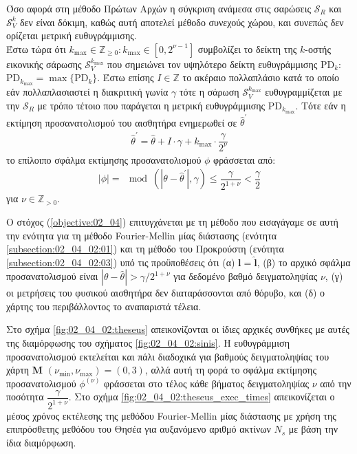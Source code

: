 Όσο αφορά στη μέθοδο Πρώτων Αρχών η σύγκριση ανάμεσα στις σαρώσεις
$\mathcal{S}_R$ και $\mathcal{S}_V^k$ δεν είναι δόκιμη, καθώς αυτή αποτελεί
μέθοδο συνεχούς χώρου, και συνεπώς δεν ορίζεται μετρική ευθυγράμμισης. \\

Έστω τώρα ότι $k_{\max} \in \mathbb{Z}_{\geq 0} : k_{\max} \in [0,2^{\nu-1}]$
συμβολίζει το δείκτη της $k$-οστής εικονικής σάρωσης $\mathcal{S}_V^{k_{\max}}$
που σημειώνει τον υψηλότερο δείκτη ευθυγράμμισης PD$_k$:
$\text{PD}_{k_{\max}} = \max \{\text{PD}_k\}$. Έστω επίσης $I \in \mathbb{Z}$
το ακέραιο πολλαπλάσιο κατά το οποίο εάν πολλαπλασιαστεί η διακριτική γωνία
$\gamma$ τότε η σάρωση $\mathcal{S}_V^{k_{\max}}$ ευθυγραμμίζεται με την
$\mathcal{S}_R$ με τρόπο τέτοιο που παράγεται η μετρική ευθυγράμμισης
PD$_{k_{\max}}$. Τότε εάν η εκτίμηση προσανατολισμού του αισθητήρα ενημερωθεί
σε $\hat{\theta}^\prime$
\begin{align}
  \hat{\theta}^\prime = \hat{\theta} + I \cdot \gamma + k_{\max} \cdot \dfrac{\gamma}{2^\nu}
\end{align}
το επίλοιπο σφάλμα εκτίμησης προσανατολισμού $\phi$ φράσσεται από:
\begin{align}
  |\phi| = \mod(|\theta - \hat{\theta}^\prime|, \gamma) \leq \dfrac{\gamma}{2^{1+\nu}} < \dfrac{\gamma}{2}
  \label{eq:phi_theseus}
\end{align}
για $\nu \in \mathbb{Z}_{>0}$.

Ο στόχος (\ref{objective:02_04}) επιτυγχάνεται με τη μέθοδο που εισαγάγαμε σε
αυτή την ενότητα για τη μέθοδο Fourier-Mellin μίας διάστασης (ενότητα
\ref{subsection:02_04_02:01}) και τη μέθοδο του Προκρούστη (ενότητα
\ref{subsection:02_04_02:03}) υπό τις προϋποθέσεις ότι (α)
$\bm{l} = \hat{\bm{l}}$, (β) το αρχικό σφάλμα προσανατολισμού είναι
$|\theta - \hat{\theta}| > \gamma / 2^{1+\nu}$ για δεδομένο βαθμό
δειγματοληψίας $\nu$, (γ) οι μετρήσεις του φυσικού αισθητήρα δεν διαταράσσονται
από θόρυβο, και (δ) ο χάρτης του περιβάλλοντος το αναπαριστά τέλεια.

Στο σχήμα \ref{fig:02_04_02:theseus} απεικονίζονται οι ίδιες αρχικές συνθήκες
με αυτές της διαμόρφωσης του σχήματος \ref{fig:02_04_02:sinis}. Η ευθυγράμμιση
προσανατολισμού εκτελείται και πάλι διαδοχικά για βαθμούς δειγματοληψίας του
χάρτη $\bm{M}$ $(\nu_{\min}, \nu_{\max}) = (0,3)$, αλλά αυτή τη φορά το σφάλμα
εκτίμησης προσανατολισμού $\phi^{(\nu)}$ φράσσεται στο τέλος κάθε βήματος
δειγματοληψίας $\nu$ από την ποσότητα $\dfrac{\gamma}{2^{1+\nu}}$. Στο σχήμα
\ref{fig:02_04_02:theseus_exec_times} απεικονίζεται ο μέσος χρόνος εκτέλεσης
της μεθόδου Fourier-Mellin μίας διάστασης με χρήση της επιπρόσθετης μεθόδου
του Θησέα για αυξανόμενο αριθμό ακτίνων $N_s$ με βάση την ίδια διαμόρφωση.

